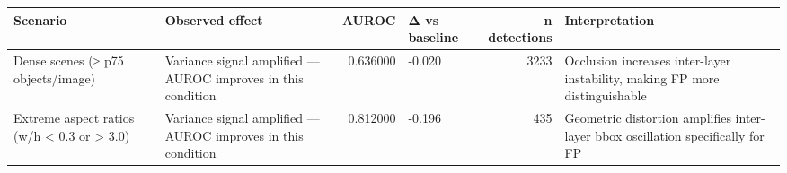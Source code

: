 \begin{tabular}{llrlrl}
\toprule
Scenario & Observed effect & AUROC & Δ vs baseline & n detections & Interpretation \\
\midrule
Dense scenes (≥ p75 objects/image) & Variance signal amplified — AUROC improves in this condition & 0.636000 & -0.020 & 3233 & Occlusion increases inter-layer instability, making FP more distinguishable \\
Extreme aspect ratios (w/h < 0.3 or > 3.0) & Variance signal amplified — AUROC improves in this condition & 0.812000 & -0.196 & 435 & Geometric distortion amplifies inter-layer bbox oscillation specifically for FP \\
\bottomrule
\end{tabular}
